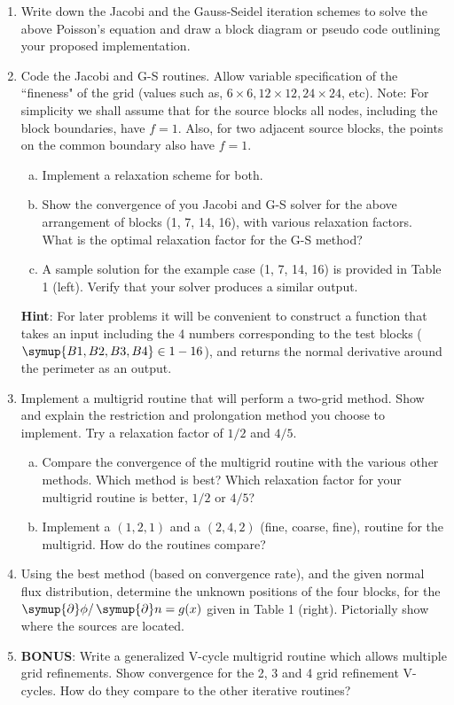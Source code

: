 \documentclass{assignment}[2019/10/15]
\begin{document}
    \begin{enumerate}[1)]
        \item Write down the Jacobi and the Gauss-Seidel iteration schemes to solve the above Poisson's equation and draw a block diagram or pseudo code outlining your proposed implementation.
        \item Code the Jacobi and G-S routines. Allow variable specification of the ``fineness" of the grid (values such as, $6\times 6, 12\times 12, 24\times 24$, etc). Note: For simplicity we shall assume that for the source blocks all nodes, including the block boundaries, have $f=1$. Also, for two adjacent source blocks, the points on the common boundary also have $f=1$.
        \begin{enumerate}[a.]
            \item Implement a relaxation scheme for both.
            \item Show the convergence of you Jacobi and G-S solver for the above arrangement of blocks (1, 7, 14, 16), with various relaxation factors. What is the optimal relaxation factor for the G-S method?
            \item A sample solution for the example case (1, 7, 14, 16) is provided in Table 1 (left). Verify that your solver produces a similar output.
        \end{enumerate}
        {\bf Hint}: For later problems it will be convenient to construct a function that takes an input including the 4 numbers corresponding to the test blocks ($\symup{B1, B2, B3, B4} \in 1-16$), and returns the normal derivative around the perimeter as an output.
        \item Implement a multigrid routine that will perform a two-grid method. Show and explain the restriction and prolongation method you choose to implement. Try a relaxation factor of $1/2$ and $4/5$.
        \begin{enumerate}[a.]
            \item Compare the convergence of the multigrid routine with the various other methods. Which method is best? Which relaxation factor for your multigrid routine is better, $1/2$ or $4/5$?
            \item Implement a $(1, 2, 1)$ and a $(2, 4, 2)$ (fine, coarse, fine), routine for the multigrid. How do the routines compare?
        \end{enumerate}
        \item Using the best method (based on convergence rate), and the given normal flux distribution, determine the unknown positions of the four blocks, for the $\mathop{}\!\symup{\partial}\phi/\mathop{}\!\symup{\partial}n=g(x)$ given in Table 1 (right). Pictorially show where the sources are located.
        \item {\bf BONUS}: Write a generalized V-cycle multigrid routine which allows multiple grid refinements. Show convergence for the 2, 3 and 4 grid refinement V-cycles. How do they compare to the other iterative routines?
    \end{enumerate}
\end{document}
